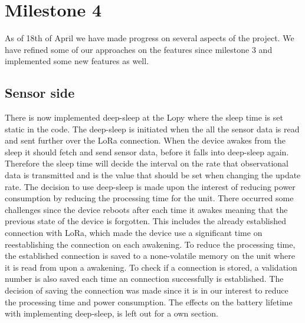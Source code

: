 \section{Milestone 4}
	As of 18th of April we have made progress on several aspects of the project. We have refined some of our approaches on the features since milestone 3 and implemented some new features as well. 
	\subsection{Sensor side}
		There is now implemented deep-sleep at the Lopy where the sleep time is set static in the code. The deep-sleep is initiated when the all the sensor data is read and sent further over the LoRa connection. When the device awakes from the sleep it should fetch and send sensor data, before it falls into deep-sleep again. Therefore the sleep time will decide the interval on the rate that observational data is transmitted and is the value that should be set when changing the update rate. The decision to use deep-sleep is made upon the interest of reducing power consumption by reducing the processing time for the unit. There occurred some challenges since the device reboots after each time it awakes meaning that the previous state of the device is forgotten. This includes the already established connection with LoRa, which made the device use a significant time on reestablishing the connection on each awakening. To reduce the processing time, the established connection is saved to a none-volatile memory on the unit where it is read from upon a awakening. To check if a connection is stored, a validation number is also saved each time an connection successfully is established. The decision of saving the connection was made since it is in our interest to reduce the processing time and power consumption. The effects on the battery lifetime with implementing deep-sleep, is left out for a own section. \\\\ 
	
